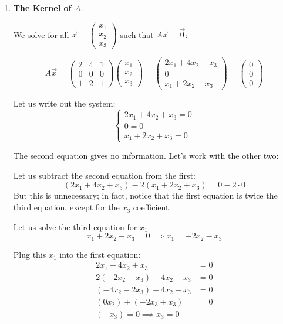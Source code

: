 \documentclass[12pt]{article}
\theoremstyle{definition}
\theoremstyle{plain}
\begin{document}
\begin{enumerate}[label=(\alph*)]
\item \textbf{The Kernel of \( A \)}.

We solve for all \( \vec{x} = \begin{pmatrix}x_1 \\ x_2 \\ x_3\end{pmatrix} \) such that \( A\vec{x} = \vec{0} \):

\[
A\vec{x} = 
\begin{pmatrix}
2 & 4 & 1 \\
0 & 0 & 0 \\
1 & 2 & 1
\end{pmatrix}
\begin{pmatrix}
x_1 \\ x_2 \\ x_3
\end{pmatrix}
=
\begin{pmatrix}
2x_1 + 4x_2 + x_3 \\
0 \\
x_1 + 2x_2 + x_3
\end{pmatrix}
= 
\begin{pmatrix}
0 \\ 0 \\ 0
\end{pmatrix}
\]

Let us write out the system:
\[
\begin{cases}
2x_1 + 4x_2 + x_3 = 0 \\
0 = 0 \\
x_1 + 2x_2 + x_3 = 0 
\end{cases}
\]

The second equation gives no information. Let's work with the other two:

Let us subtract the second equation from the first:
\[
(2x_1 + 4x_2 + x_3) - 2(x_1 + 2x_2 + x_3) = 0 - 2 \cdot 0
\]
But this is unnecessary; in fact, notice that the first equation is twice the third equation, except for the \( x_3 \) coefficient:

Let us solve the third equation for \( x_1 \):
\[
x_1 + 2x_2 + x_3 = 0 \implies x_1 = -2x_2 - x_3
\]

Plug this \( x_1 \) into the first equation:
\begin{align*}
2x_1 + 4x_2 + x_3 &= 0\\
2(-2x_2 - x_3) + 4x_2 + x_3 &= 0\\
(-4x_2 - 2x_3) + 4x_2 + x_3 &= 0 \\
(0x_2) + (-2x_3 + x_3) &= 0\\
(-x_3) = 0 \implies x_3 = 0
\end{align*}


\end{enumerate}
\end{document}
